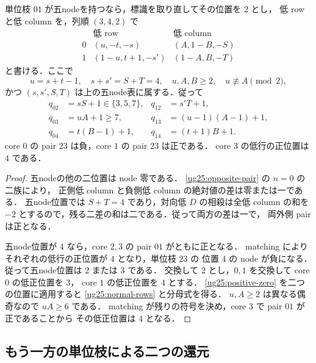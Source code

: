 \begin{lemma}\label{ug25:normal-form}
単位枝 $01$ が五nodeを持つなら，標識を取り直してその位置を $2$ とし，
低 row と低 column を，列順 $(3,4,2)$ で
\begin{equation}\label{ug25:normal-rows}
 \begin{array}{c|c|c}
 &\text{低 row}&\text{低 column}\\\hline
 0&(u,-t,-s)&(A,1-B,-S)\\
 1&(1-u,t+1,-s')&(1-A,B,-T)
 \end{array}
\end{equation}
と書ける．ここで
\[
 u=s+t-1,\quad s+s'=S+T=4,\quad u,A,B\ge2,
 \quad u\not\equiv A\pmod2,
\]
かつ $(s,s',S,T)$ は上の五node表に属する．従って
\begin{align}
 q_{02}&=sS+1\in\{3,5,7\},&q_{12}&=s'T+1,\label{ug25:qnormal1}\\
 q_{03}&=uA+1\ge7,&q_{13}&=(u-1)(A-1)+1,\label{ug25:qnormal2}\\
 q_{04}&=t(B-1)+1,&q_{14}&=(t+1)B+1.\label{ug25:qnormal3}
\end{align}
core $0$ の pair $23$ は負，core $1$ の pair $23$ は正である．
core $3$ の低行の正位置は $4$ である．
\end{lemma}

\begin{proof}
五nodeの他の二位置は node 零である．
\eqref{ug25:opposite-pair} の $n=0$ の二族により，
正側低 column と負側低 column の絶対値の差は零または一である．
五node位置では $S+T=4$ であり，対向低 $D$ の相殺は全低 column の和を
$-2$ とするので，残る二差の和は二である．従って両方の差は一で，
両外側 pair は正となる．

五node位置が $4$ なら，core $2,3$ の pair $01$ がともに正となる．
matching によりそれぞれの低行の正位置が $4$ となり，単位枝 $23$ の
位置 $4$ の node が負になる．従って五node位置は $2$ または $3$ である．
交換して $2$ とし，$0,1$ を交換して core $0$ の低正位置を $3$，
core $1$ の低正位置を $4$ とする．
\eqref{ug25:positive-zero} を二つの位置に適用すると
\eqref{ug25:normal-rows} と分母式を得る．
$u,A\ge2$ は異なる偶奇なので $uA\ge6$ である．
matching が残りの符号を決め，core $3$ で pair $01$ が正であることから
その低正位置は $4$ となる．
\end{proof}

\subsection{もう一方の単位枝による二つの還元}

